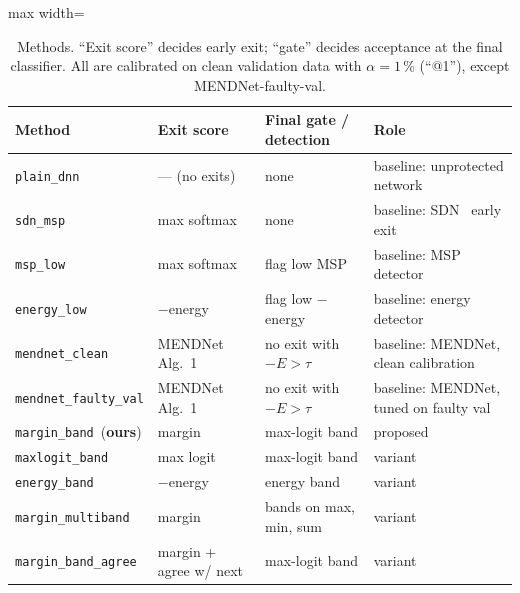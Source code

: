 \documentclass[10pt,a4paper]{article}
\newcommand{\meth}[1]{\texttt{#1}}
\newcommand{\ours}{\meth{margin\_band}}
\begin{document}
\begin{table}[H]
\centering\small
\caption{Methods. ``Exit score'' decides early exit; ``gate'' decides acceptance at the final classifier.
All are calibrated on clean validation data with $\alpha=1\,\%$ (``@1''), except MENDNet-faulty-val.}
\label{tab:methods}
\begin{adjustbox}{max width=\linewidth}
\begin{tabular}{@{}llll@{}}
\toprule
Method & Exit score & Final gate / detection & Role \\
\midrule
\meth{plain\_dnn}            & --- (no exits)          & none                         & baseline: unprotected network \\
\meth{sdn\_msp}              & max softmax             & none                         & baseline: SDN~\cite{sdn} early exit \\
\meth{msp\_low}              & max softmax             & flag low MSP                 & baseline: MSP detector~\cite{msp} \\
\meth{energy\_low}           & $-$energy               & flag low $-$energy           & baseline: energy detector~\cite{energy} \\
\meth{mendnet\_clean}        & MENDNet Alg.~1          & no exit with $-E>\tau$       & baseline: MENDNet, clean calibration \\
\meth{mendnet\_faulty\_val}  & MENDNet Alg.~1          & no exit with $-E>\tau$       & baseline: MENDNet, tuned on faulty val \\
\midrule
\ours\ (\textbf{ours})       & margin                  & max-logit band               & proposed \\
\meth{maxlogit\_band}        & max logit               & max-logit band               & variant \\
\meth{energy\_band}          & $-$energy               & energy band                  & variant \\
\meth{margin\_multiband}     & margin                  & bands on max, min, sum       & variant \\
\meth{margin\_band\_agree}   & margin + agree w/ next  & max-logit band               & variant \\
\bottomrule
\end{tabular}
\end{adjustbox}
\end{table}
\end{document}

